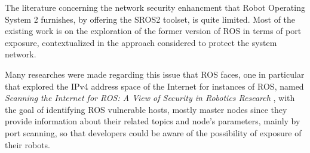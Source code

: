 

The literature concerning the network security enhancment that Robot Operating System 2 furnishes, by offering the SROS2 toolset, is quite limited. Most of the existing work is on the exploration of the former version of ROS in terms of port exposure, contextualized in the approach considered to protect the system network.  

Many researches were made regarding this issue that ROS faces, one in particular that explored the IPv4 address space of the Internet for instances of ROS, named \textit{Scanning the Internet for ROS: A View of Security in Robotics Research} \cite{8794451}, with the goal of identifying ROS vulnerable hosts, mostly master nodes since they provide information about their related topics and node's parameters, mainly by port scanning, so that developers could be aware of the possibility of exposure of their robots. %

